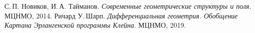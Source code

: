 \begin{thebibliography}{9}
	 С.\,П. Новиков, И.\,А. Тайманов. \textit{Современные геометрические структуры и поля}. МЦНМО, 2014.
	 Ричард У.\,Шарп. \textit{Дифференциальная геометрия. Обобщение Картана Эрлангенской программы Клейна}. МЦНМО, 2019.
\end{thebibliography}

